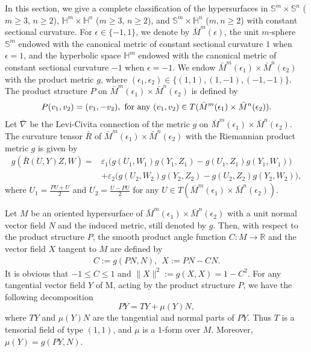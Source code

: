 \documentclass[reqno]{amsart}%
\theoremstyle{definition}
\numberwithin{equation}{section}
\begin{document}
In this section, we give a complete classification of the hypersurfaces in $\mathbb{S}^m\times \mathbb{S}^n$ ($m\geq3$, $n\geq2$), 
$\mathbb{H}^m\times \mathbb{H}^n$ ($m\geq3$, $n\geq2$), and $\mathbb{S}^m\times \mathbb{H}^n$ ($m,n\geq2$) with constant sectional curvature. 
For $\epsilon\in \{-1,1\}$, 
we denote by $\bar{M}^m(\epsilon)$, the unit $m$-sphere
$\mathbb S^{m}$ 
endowed with the canonical metric of constant sectional curvature $1$ when $\epsilon= 1$,
and the hyperbolic space 
$\mathbb{H}^{m}$ endowed with the canonical metric of constant sectional curvature $-1$ when $\epsilon= -1$. 
We endow $\bar{M}^m(\epsilon_1)\times \bar{M}^n(\epsilon_2)$ 
with the product metric $g$, where $(\epsilon_1,\epsilon_2)\in\{(1,1), (1,-1), (-1,-1)\}$.  
The product structure $P$ on $\bar{M}^m(\epsilon_1)\times \bar{M}^n(\epsilon_2)$
is defined by
%
$$
P(v_1,v_2)=(v_1,-v_2),~\hbox{for any}~(v_1,v_2)\in T(\bar{M}^m(\epsilon_1)\times \bar{M}^n(\epsilon_2)).
$$
Let $\bar{\nabla}$ be the Levi-Civita connection of the metric 
$g$ on $\bar{M}^m(\epsilon_1)\times \bar{M}^n(\epsilon_2)$. 
The curvature tensor $\bar{R}$ of $\bar{M}^m(\epsilon_1)\times \bar{M}^n(\epsilon_2)$ 
with the Riemannian product metric $g$ is given by
\begin{equation}\label{eqn:apxql}
\begin{aligned}
g(\bar{R}(U,Y)Z,W)=&\varepsilon_1\Big(g(U_1,W_1)g(Y_1,Z_1)-g(U_1,Z_1)g(Y_1,W_1)\Big)\\
&+\varepsilon_2\Big(g(U_2,W_2)g(Y_2,Z_2)-g(U_2,Z_2)g(Y_2,W_2)\Big), 
\end{aligned}
\end{equation}
where $U_1=\frac{PU+U}{2}$ and $U_2=\frac{U-PU}{2}$ for any $U\in T(\bar{M}^m(\epsilon_1)\times \bar{M}^n(\epsilon_2))$. 

Let $M$ be an oriented hypersurface of $\bar{M}^m(\epsilon_1)\times \bar{M}^n(\epsilon_2)$ with a unit normal vector field $N$ and the induced 
metric, still denoted by $g$. Then, with respect
to the product structure $P$, the smooth product angle function $C:M\rightarrow\mathbb R$
and the vector field $X$ tangent to $M$ are defined by
%
\begin{align*}
	C:=g(PN,N ),\ \ 	X:=PN-CN.
\end{align*}
%
It is obvious that $-1\le C\le1$ and $\|X\|^2:=g(X,X)=1-C^2$.
For any tangential vector field $Y$ of M, acting by the product structure $P$, we have the following decomposition
$$
PY=TY+\mu(Y)N, 
$$
where $TY$ and $\mu(Y)N$ are the tangential and normal parts of $PY$. Thus $T$ is a tensorial field of type $(1,1)$, and $\mu$ is a $1$-form over $M$. Moreover, $\mu(Y)=g(PY,N)$.
\end{document}
